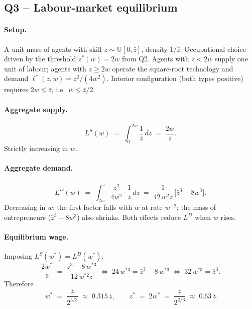 \documentclass[11pt,a4paper]{article}
\begin{document}
\subsection*{Q3 -- Labour-market equilibrium}

\paragraph{Setup.}
A unit mass of agents with skill $z\sim\mathrm{U}[0,\bar z]$, density $1/\bar z$. Occupational choice driven by the threshold $z^{*}(w)=2w$ from Q2. Agents with $z<2w$ supply one unit of labour; agents with $z\ge 2w$ operate the square-root technology and demand $\ell^{*}(z,w)=z^{2}/(4w^{2})$. Interior configuration (both types positive) requires $2w\le\bar z$, i.e.\ $w\le\bar z/2$.

\paragraph{Aggregate supply.}
\begin{equation}
L^{S}(w)\;=\;\int_{0}^{2w}\frac{1}{\bar z}\,dz\;=\;\frac{2w}{\bar z}.
\label{eq:q3_LS}
\end{equation}
Strictly increasing in $w$.

\paragraph{Aggregate demand.}
\begin{equation}
L^{D}(w)\;=\;\int_{2w}^{\bar z}\frac{z^{2}}{4w^{2}}\cdot\frac{1}{\bar z}\,dz
\;=\;\frac{1}{12\,w^{2}\bar z}\,\bigl[\bar z^{3}-8w^{3}\bigr].
\label{eq:q3_LD}
\end{equation}
Decreasing in $w$: the first factor falls with $w$ at rate $w^{-2}$; the mass of entrepreneurs ($\bar z^{3}-8w^{3}$) also shrinks. Both effects reduce $L^{D}$ when $w$ rises.

\paragraph{Equilibrium wage.}
Imposing $L^{S}(w^{*})=L^{D}(w^{*})$:
\[
\frac{2w^{*}}{\bar z}\;=\;\frac{\bar z^{3}-8\,w^{*3}}{12\,w^{*2}\bar z}
\;\Longleftrightarrow\;24\,w^{*3}=\bar z^{3}-8\,w^{*3}
\;\Longleftrightarrow\;32\,w^{*3}=\bar z^{3}.
\]
Therefore
\begin{equation}
\boxed{\;w^{*}\;=\;\frac{\bar z}{2^{5/3}}\;\approx\;0.315\,\bar z,\qquad
z^{*}\;=\;2w^{*}\;=\;\frac{\bar z}{2^{2/3}}\;\approx\;0.63\,\bar z.}
\label{eq:q3_eq}
\end{equation}
\end{document}
